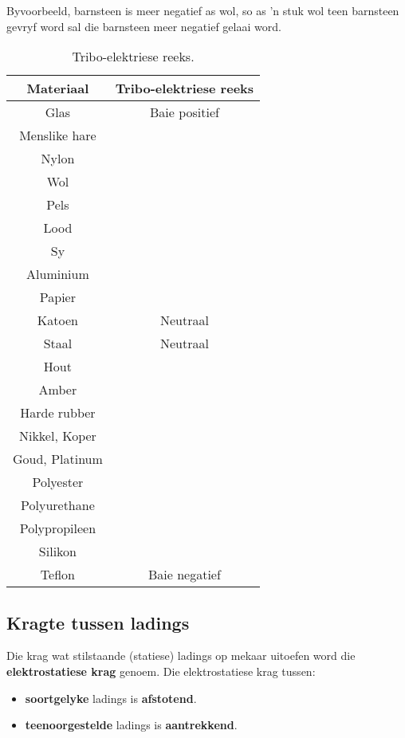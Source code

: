 Byvoorbeeld, barnsteen is meer negatief as wol, so as 'n stuk wol teen barnsteen gevryf word sal die barnsteen meer negatief gelaai word.


\begin{center}
\begin{table}[H]
\centering
\begin{tabular}{|cc|}\hline
\textbf{Materiaal}&\textbf{Tribo-elektriese reeks}\\\hline
Glas& Baie positief\\\hline
Menslike hare&\\\hline
Nylon&\\\hline
Wol&\\\hline
Pels&\\\hline
Lood&\\\hline
Sy&\\\hline
Aluminium&\\\hline
Papier&\\\hline
Katoen&Neutraal\\\hline
Staal &Neutraal\\\hline
Hout&\\\hline
Amber&\\\hline
Harde rubber&\\\hline
Nikkel, Koper&\\\hline
Goud, Platinum&\\\hline
Polyester&\\\hline
Polyurethane&\\\hline
Polypropileen&\\\hline
Silikon&\\\hline
Teflon& Baie negatief\\\hline
\end{tabular}
\caption{Tribo-elektriese reeks.}
\end{table}
\end{center}


\subsection{Kragte tussen ladings}
            \nopagebreak

Die krag wat stilstaande (statiese) ladings op mekaar uitoefen word die \textbf{elektrostatiese krag} genoem. Die elektrostatiese krag tussen:

\begin{itemize}[noitemsep]
\item \textbf{soortgelyke} ladings is \textbf{afstotend}.
\item \textbf{teenoorgestelde} ladings is \textbf{aantrekkend}.
\end{itemize}

